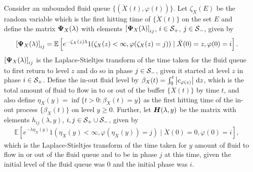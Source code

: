 Consider an unbounded fluid queue \(\{(\ddot X(t), \varphi(t))\}\). Let \(\zeta_X(E)\) be the random variable which is the first hitting time of \(\{\ddot X(t)\}\) on the set \(E\) and define the matrix \(\boldsymbol \Psi_X(\lambda)\) with elements \(\left[\boldsymbol \Psi_X(\lambda)\right]_{ij}\), \(i\in\mathcal{S}_+\), \(j\in\mathcal{S}_-\), given by
\begin{align}
	\left[\boldsymbol \Psi_X(\lambda)\right]_{ij} = \mathbb E\left[ e^{-\zeta_X(z)\lambda} 1(\zeta_X(z)<\infty, \varphi(\zeta_X(z)=j))\mid \ddot X(0)=z, \varphi(0)=i\right].
\end{align}
\(\left[\boldsymbol \Psi_X(\lambda)\right]_{ij}\) is the Laplace-Stieltjes transform of the time taken for the fluid queue to first return to level \(z\) and do so in phase \(j\in\mathcal{S}_-\), given it started at level \(z\) in phase \(i\in\mathcal{S}_+\). Define the in-out fluid level by $\beta_X(t) = \int_0^t \left| c_{\varphi(z)} \right|  \, \mathrm{d} z$, which is the total amount of fluid to flow in to or out of the buffer \(\{\ddot X(t)\}\) by time \(t\), and also define $\eta_X(y) = \inf \{t > 0: \beta_X(t) = y\}$ as the first hitting time of the in-out process \(\{\beta_X(t)\}\) on level \(y\geq 0\). Further, let \(\boldsymbol H(\lambda,y)\) be the matrix with elements \(h_{ij}(\lambda,y)\), \(i,j\in\mathcal{S}_+\cup\mathcal{S}_-\), given by
\begin{align}
	\mathbb E\left[e^{-\lambda \eta_X(y)}1(\eta_X(y)<\infty,\varphi(\eta_X(y))=j)\mid \ddot X(0)=0, \varphi(0)=i\right],
\end{align}
which is the Laplace-Stieltjes transform of the time taken for \(y\) amount of fluid to flow in or out of the fluid queue and to be in phase \(j\) at this time, given the initial level of the fluid queue was \(0\) and the initial phase was \(i\). 

